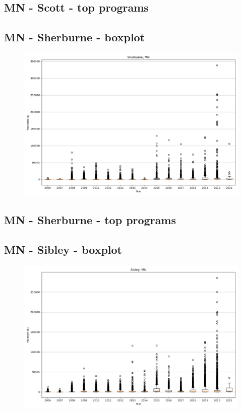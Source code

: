 \subsection*{MN - Scott - top programs}

\newpage
\subsection*{MN - Sherburne - boxplot}
\begin{figure}[h]
\centering
\includegraphics[width=7in]{../output/boxplots/counties/Sherburne-MN_boxplot.png}
\end{figure}


\subsection*{MN - Sherburne - top programs}

\newpage
\subsection*{MN - Sibley - boxplot}
\begin{figure}[h]
\centering
\includegraphics[width=7in]{../output/boxplots/counties/Sibley-MN_boxplot.png}
\end{figure}


